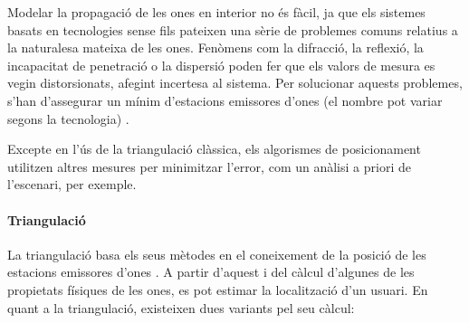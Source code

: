 Modelar la propagació de les ones en interior no és fàcil, ja que els sistemes basats en tecnologies sense fils pateixen una sèrie de problemes comuns relatius a la naturalesa mateixa de les ones. Fenòmens com la difracció, la reflexió, la incapacitat de penetració o la dispersió poden fer que els valors de mesura es vegin distorsionats, afegint incertesa al sistema. Per solucionar aquests problemes, s’han d’assegurar un mínim d'estacions emissores d’ones (el nombre pot variar segons la tecnologia) \cite{bagosi}.

Excepte en l'ús de la triangulació clàssica, els algorismes de posicionament utilitzen altres mesures per minimitzar l'error, com un anàlisi a priori de l'escenari, per exemple.

\paragraph{Triangulació}

La triangulació basa els seus mètodes en el coneixement de la posició de les estacions emissores d’ones \cite{bagosi}. A partir d’aquest i del càlcul d’algunes de les propietats físiques de les ones, es pot estimar la localització d’un usuari. En quant a la triangulació, existeixen dues variants pel seu càlcul:

